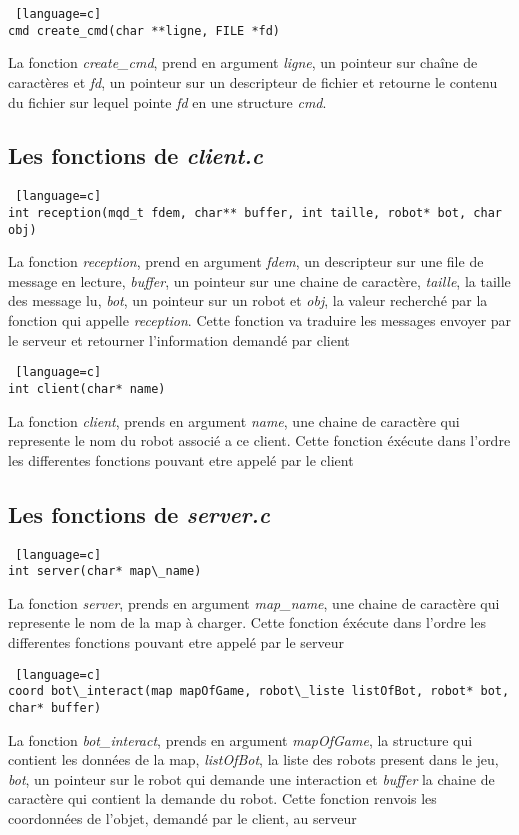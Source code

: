 \documentclass[a4paper, 11pt]{article}
\begin{document}
\begin {lstlisting} [language=c]
cmd create_cmd(char **ligne, FILE *fd)
\end{lstlisting}
La fonction \emph{create\_cmd}, prend en argument \emph{ligne}, un pointeur sur chaîne de caractères et \emph{fd}, un pointeur sur un descripteur de fichier et retourne le contenu du fichier sur lequel pointe \emph{fd} en une structure \emph{cmd}.\\

\newpage
\subsection{Les fonctions de \emph{client.c}}
\begin {lstlisting} [language=c]
int reception(mqd_t fdem, char** buffer, int taille, robot* bot, char obj)
\end{lstlisting}
La fonction \emph{reception}, prend en argument \emph{fdem}, un descripteur sur une file de message en lecture, \emph{buffer}, un pointeur sur une chaine de caractère, \emph{taille}, la taille des message lu, \emph{bot}, un pointeur sur un robot et \emph{obj}, la valeur recherché par la fonction qui appelle \emph{reception}. Cette fonction va traduire les messages envoyer par le serveur et retourner l'information demandé par client\\

\begin {lstlisting} [language=c]
int client(char* name)
\end{lstlisting}
La fonction \emph{client}, prends en argument \emph{name}, une chaine de caractère qui represente le nom du robot associé a ce client. Cette fonction éxécute dans l'ordre les differentes fonctions pouvant etre appelé par le client\\

\newpage
\subsection{Les fonctions de \emph{server.c}}
\begin {lstlisting} [language=c]
int server(char* map\_name)
\end{lstlisting}
La fonction \emph{server}, prends en argument \emph{map\_name}, une chaine de caractère qui represente le nom de la map à charger. Cette
fonction éxécute dans l'ordre les differentes fonctions pouvant etre appelé par le serveur\\

\begin {lstlisting} [language=c]
coord bot\_interact(map mapOfGame, robot\_liste listOfBot, robot* bot, char* buffer)
\end{lstlisting}
La fonction \emph{bot\_interact}, prends en argument \emph{mapOfGame}, la structure qui contient les données de la map, \emph{listOfBot}, la liste des robots present dans le jeu, \emph{bot}, un pointeur sur le robot qui demande une interaction et \emph{buffer} la chaine de caractère qui contient la demande du robot. Cette fonction renvois les coordonnées de l'objet, demandé par le client, au serveur\\
\end{document}
